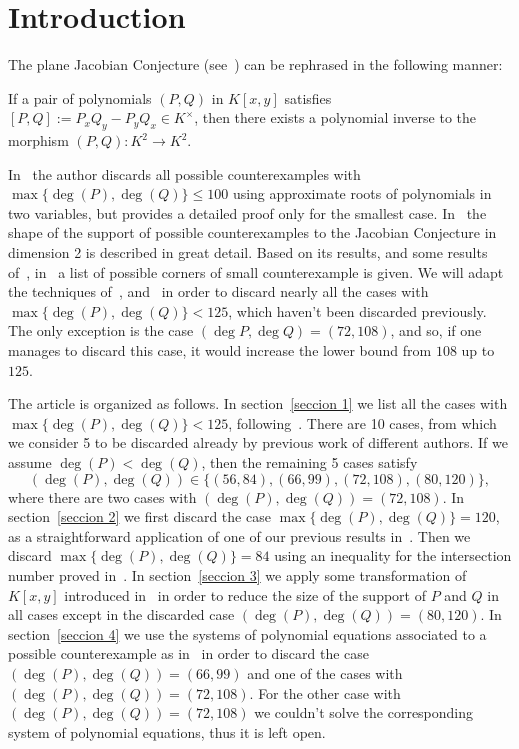 \documentclass[reqno,a4paper,twoside]{amsart}
\theoremstyle{definition}
\theoremstyle{remark}
\begin{document}
\setcounter{tocdepth}{2}
\tableofcontents


\section{Introduction}
The plane Jacobian Conjecture (see~\cite{K}) can be rephrased in the following manner:

If a pair of polynomials $(P,Q)$ in $K[x,y]$ satisfies $[P,Q]:= P_x Q_y-P_y Q_x\in K^{\times}$, then there exists a
polynomial inverse to the morphism $(P,Q):K^2\to K^2$.

In~\cite{M} the author discards all possible counterexamples with $\max\{\deg(P),\deg(Q)\}\le 100$ using approximate roots of
polynomials in two variables, but provides a detailed proof only for the smallest case.
In~\cite{GGV1} the shape of the support of possible counterexamples to the Jacobian Conjecture in dimension 2 is described in great detail.
Based on its results, and some results of~\cite{GGV2},
in~\cite{GGV5} a list of possible corners of small counterexample is given. We will adapt the
techniques of~\cite{GGV1}, \cite{GGV2} and~\cite{GGV3} in order to
discard nearly all the cases with $\max\{\deg(P),\deg(Q)\}<125$, which haven't been discarded previously. The only exception is
the case $(\deg P,\deg Q)=(72,108)$, and so, if one manages to discard this case, it would increase the lower bound from $108$ up to $125$.

The article is organized as follows. In section~\ref{seccion 1} we list all the cases with $\max\{\deg(P),\deg(Q)\}<125$, following~\cite{GGV5}.
There are 10 cases, from which we consider 5 to be discarded already by previous work of different authors. If we assume
$\deg(P)<\deg(Q)$, then the remaining 5 cases satisfy
$$
(\deg(P),\deg(Q))\in\{(56,84),(66,99),(72,108),(80,120)\},
$$
where there are two cases with $(\deg(P),\deg(Q))=(72,108)$. In section~\ref{seccion 2} we first discard the case
$\max\{\deg(P),\deg(Q)\}=120$, as a straightforward application of one of our previous results in~\cite{GGV2}.
 Then we discard $\max\{\deg(P),\deg(Q)\}=84$
using an inequality for the intersection number proved in~\cite{GGV6}.
In section~\ref{seccion 3} we apply some transformation of $K[x,y]$ introduced in~\cite{GGV1} in order to reduce the size
of the support of $P$ and $Q$ in all cases except in the discarded case $(\deg(P),\deg(Q))=(80,120)$.
In section~\ref{seccion 4} we use the systems of polynomial equations associated to a possible counterexample as in~\cite{GGV3} in order
to discard the case $(\deg(P),\deg(Q))=(66,99)$ and one of the cases with $(\deg(P),\deg(Q))=(72,108)$. For the other case
with $(\deg(P),\deg(Q))=(72,108)$ we couldn't solve the corresponding system of polynomial equations, thus it is left open.
\end{document}
